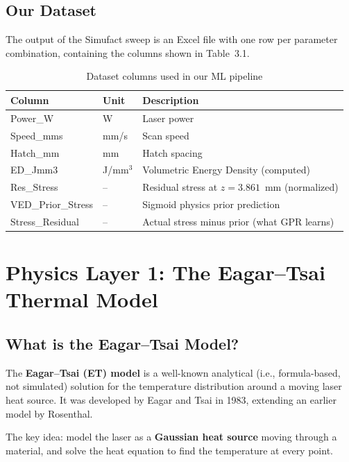 \documentclass[12pt,a4paper]{report}
\begin{document}
\section{Our Dataset}

The output of the Simufact sweep is an Excel file with one row per parameter combination, containing the columns shown in Table~3.1.

\begin{table}[h!]
\centering
\caption{Dataset columns used in our ML pipeline}
\begin{tabular}{@{}lll@{}}
\toprule
\textbf{Column} & \textbf{Unit} & \textbf{Description} \\
\midrule
Power\_W & W & Laser power \\
Speed\_mms & mm/s & Scan speed \\
Hatch\_mm & mm & Hatch spacing \\
ED\_Jmm3 & J/mm$^3$ & Volumetric Energy Density (computed) \\
Res\_Stress & -- & Residual stress at $z=3.861$~mm (normalized) \\
VED\_Prior\_Stress & -- & Sigmoid physics prior prediction \\
Stress\_Residual & -- & Actual stress minus prior (what GPR learns) \\
\bottomrule
\end{tabular}
\end{table}

\chapter{Physics Layer 1: The Eagar--Tsai Thermal Model}

\section{What is the Eagar--Tsai Model?}

The \textbf{Eagar--Tsai (ET) model} is a well-known analytical (i.e., formula-based, not simulated) solution for the temperature distribution around a moving laser heat source. It was developed by Eagar and Tsai in 1983, extending an earlier model by Rosenthal.

The key idea: model the laser as a \textbf{Gaussian heat source} moving through a material, and solve the heat equation to find the temperature at every point.
\end{document}
